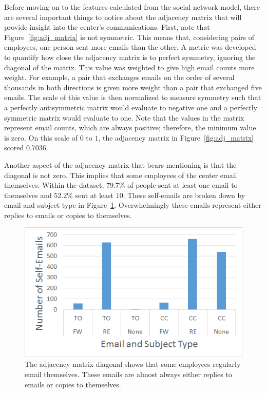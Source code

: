 \documentclass[12pt]{report}
\begin{document}
Before moving on to the features calculated from the social network model, there are several important things to notice about the adjacency matrix that will provide insight into the center's communications.
First, note that Figure~\ref{fig:adj_matrix} is not symmetric.
This means that, considering pairs of employees, one person sent more emails than the other.
A metric was developed to quantify how close the adjacency matrix is to perfect symmetry, ignoring the diagonal of the matrix.
This value was weighted to give high email counts more weight.
For example, a pair that exchanges emails on the order of several thousands in both directions is given more weight than a pair that exchanged five emails.
The scale of this value is then normalized to measure symmetry such that a perfectly antisymmetric matrix would evaluate to negative one and a perfectly symmetric matrix would evaluate to one.
Note that the values in the matrix represent email counts, which are always positive; therefore, the minimum value is zero.
On this scale of $0$ to $1$, the adjacency matrix in Figure~\ref{fig:adj_matrix} scored $0.7036$.

Another aspect of the adjacency matrix that bears mentioning is that the diagonal is not zero.
This implies that some employees of the center email themselves.
Within the dataset, $79.7\%$ of people sent at least one email to themselves and $52.2\%$ sent at least $10$.
These self-emails are broken down by email and subject type in Figure~\ref{fig:self-emails}.
Overwhelmingly these emails represent either replies to emails or copies to themselves.

\begin{figure}[t]
	\centering
	\includegraphics[width=0.7\columnwidth,trim={2mm 1mm 2mm 2mm},clip]{Self-emails_bar}
	\vspace{-17pt}
	\caption[Types of emails employees sent to themselves]{The adjacency matrix diagonal shows that some employees regularly email themselves.  These emails are almost always either replies to emails or copies to themselves.}
	\label{fig:self-emails}
\end{figure}
\end{document}
